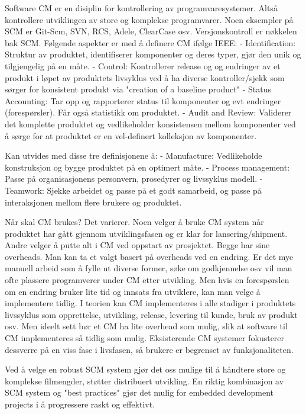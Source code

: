 Software CM er en disiplin for kontrollering av programvaresystemer. Altså kontrollere utviklingen av store og komplekse programvarer. Noen eksempler på SCM er Git-Scm, SVN, RCS, Adele, ClearCase osv. Versjonskontroll er nøkkelen bak SCM. Følgende aspekter er med å definere CM ifølge IEEE:
-	Identification: Struktur av produktet, identifiserer komponenter og deres typer, gjør den unik og tilgjengelig på en måte.
-	Control: Kontrollerer release og og endringer av et produkt i løpet av produktets livsyklus ved å ha diverse kontroller/sjekk som sørger for konsistent produkt via "creation of a baseline product"
-	Status Accounting: Tar opp og rapporterer status til komponenter og evt endringer (forespørsler). Får også  statistikk om produktet.
-	Audit and Review: Validerer det komplette produktet og vedlikeholder konsistensen mellom komponenter ved å sørge for at produktet er en vel-definert kolleksjon av komponenter.

Kan utvides med disse tre definisjonene å:
-	Manufacture: Vedlikeholde konstruksjon og bygge produktet på en optimert måte. 
-	Process management: Passe på organisasjonens personvern, prosedyrer og livssyklus modell.
-	Teamwork: Sjekke arbeidet og passe på et godt samarbeid, og passe på interaksjonen mellom flere brukere og produktet.

Når skal CM brukes? Det varierer. Noen velger å bruke CM system når produktet har gått gjennom utviklingsfasen og er klar for lansering/shipment. Andre velger å putte alt i CM ved oppstart av prosjektet. Begge har sine overheads. Man kan ta et valgt basert på overheads ved en endring. Er det mye manuell arbeid som å fylle ut diverse former, søke om godkjennelse osv vil man ofte plassere programverer under CM etter utvikling. Men hvis en forespørslen om en endring bruker lite tid og innsats fra utviklere, kan man velge å implementere tidlig. I teorien kan CM implementeres i alle stadiger i produktets livssyklus som opprettelse, utvikling, release, levering til kunde, bruk av produkt osv. Men ideelt sett bør et CM ha lite overhead som mulig, slik at software til CM implementeres så tidlig som mulig. Eksisterende CM systemer fokusterer dessverre på en viss fase i livsfasen, så brukere er begrenset av funksjonaliteten.



Ved å velge en robust SCM system gjør det oss mulige til å håndtere store og komplekse filmengder, støtter distribuert utvikling. En riktig kombinasjon av SCM system og "best practices" gjør det mulig for embedded development projects i å progressere raskt og effektivt.



